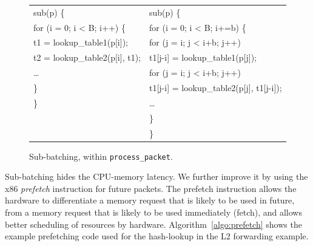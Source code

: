 \begin{figure}[ht]
\begin{small}
\begin{tabular}[b]{l|l}
sub\hspace{0.2cm}{\bf process\_packet}(p) \{ & sub\hspace{0.2cm}{\bf process\_packet}(p) \{\\
\hspace{0.3cm}for (i = 0; i < B; i++) \{ &\hspace{0.3cm}for (i = 0; i < B; i+=b) \{\\
\hspace{0.6cm}t1 = lookup\_table1(p[i]); &\hspace{0.6cm}for (j = i; j < i+b; j++)\\
\hspace{0.6cm}t2 = lookup\_table2(p[i], t1); & \hspace{0.9cm}t1[j-i] = lookup\_table1(p[j]);\\
\hspace{0.6cm}\ldots &\hspace{0.6cm}for (j = i; j < i+b; j++)\\
\hspace{0.3cm}\} & \hspace{0.9cm}t1[j-i] = lookup\_table2(p[j], t1[j-i]);\\
\}&\hspace{0.6cm}\ldots\\
&\hspace{0.3cm}\}\\
&\}\\
\end{tabular}
\end{small}
\caption{\label{fig:loop_fission_subbatch} Sub-batching, within {\tt process\_packet}.}
\end{figure}

Sub-batching hides the CPU-memory latency. We further improve it by using the 
x86 {\em prefetch} instruction for future packets.
The prefetch instruction allows the hardware to differentiate a memory
request that is likely to be used in future, from a memory request that is likely
to be used immediately (fetch), and allows better scheduling of resources by hardware.
Algorithm~\ref{algo:prefetch}
shows the example prefetching code used for the hash-lookup in the L2 forwarding example.

